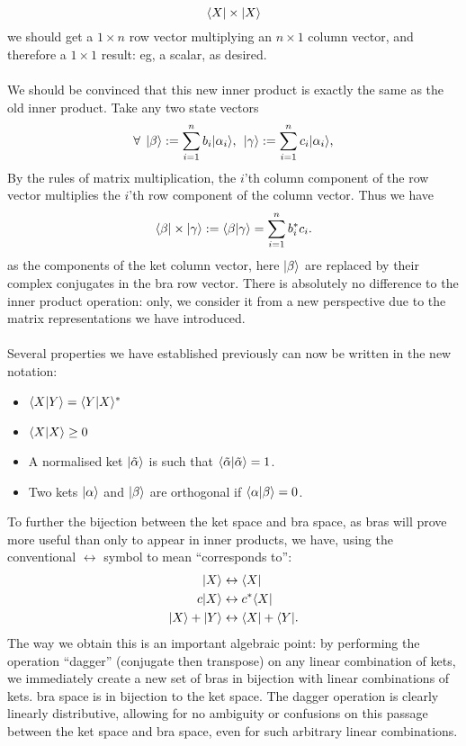 $$
\langle X| \times |X\rangle
$$
we should get a $1\times n$ row vector multiplying an $n\times 1$ column vector, and therefore a $1\times 1$ result: eg, a scalar, as desired. 
\\\\
We should be convinced that this new inner product is exactly the same as the old inner product. Take any two state vectors
$$
\forall\:\:|\beta\rangle:=\sum_{i=1}^{n}b_{i}|\alpha_{i}\rangle, \:\: |\gamma\rangle:=\sum_{i=1}^{n}c_{i}|\alpha_{i}\rangle,
$$
By the rules of matrix multiplication, the  $i$'th column component of the row vector multiplies the $i$'th row component of the column vector. Thus we have
$$
\langle\beta|\times|\gamma\rangle:=\langle\beta|\gamma\rangle=\sum_{i=1}^{n}b^{\ast}_{i}c_{i}.
$$
as the components of the ket column vector, here $|\beta\rangle$ are replaced by their complex conjugates in the bra row vector. There is absolutely no difference to the inner product operation: only, we consider it from a new perspective due to the matrix representations we have introduced.
\\\\
Several properties we have established previously can now be written in the new notation:
\begin{itemize}
    \item $\langle X|Y\rangle=\langle Y|X\rangle^{\ast}$
    \item $\langle X|X\rangle\geq0$
    \item A normalised ket $|\tilde{\alpha}\rangle$ is such that $\langle\tilde{\alpha}|{\tilde{\alpha}}\rangle=1$.
    \item Two kets $|\alpha\rangle$ and $|\beta\rangle$ are orthogonal if $\langle\alpha|\beta\rangle=0$.
\end{itemize}
To further the bijection between the ket space and bra space, as bras will prove more useful than only to appear in inner products, we have, using the conventional $\leftrightarrow$ symbol to mean ``corresponds to'':
$$
\begin{aligned}
|X\rangle&\leftrightarrow\langle X|\\
c|X\rangle&\leftrightarrow c^{\ast}\langle X|\\
|X\rangle+|Y\rangle&\leftrightarrow \langle X|+\langle Y|.\\
\end{aligned}
$$
The way we obtain this is an important algebraic point: by performing the operation ``dagger'' (conjugate then transpose) on any linear combination of kets, we immediately create a new set of bras in bijection with linear combinations of kets. bra space is in bijection to the ket space. The dagger operation is clearly linearly distributive, allowing for no ambiguity or confusions on this passage between the ket space and bra space, even for such arbitrary linear combinations.
